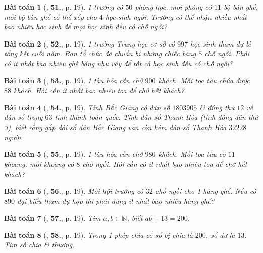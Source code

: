 \documentclass{article}
\numberwithin{equation}{section}
\newtheorem{baitoan}{Bài toán}[section]
\begin{document}
\begin{baitoan}[\cite{Trong_Toan_6_2021}, \textbf{51.}, p. 19]
	1 trường có $50$ phòng học, mỗi phòng có $11$ bộ bàn ghế, mỗi bộ bàn ghế có thể xếp cho $4$ học sinh ngồi. Trường có thể nhận nhiều nhất bao nhiêu học sinh để mọi học sinh đều có chỗ ngồi?
\end{baitoan}

\begin{baitoan}[\cite{Trong_Toan_6_2021}, \textbf{52.}, p. 19]
	1 trường Trung học cơ sở có $997$ học sinh tham dự lễ tổng kết cuối năm. Ban tổ chức đã chuẩn bị những chiếc băng $5$ chỗ ngồi. Phải có ít nhất bao nhiêu ghế băng như vậy để tất cả học sinh đều có chỗ ngồi?
\end{baitoan}

\begin{baitoan}[\cite{Trong_Toan_6_2021}, \textbf{53.}, p. 19]
	1 tàu hỏa cần chở $900$ khách. Mỗi toa tàu chứa được $88$ khách. Hỏi cần ít nhất bao nhiêu toa để chở hết khách?
\end{baitoan}

\begin{baitoan}[\cite{Trong_Toan_6_2021}, \textbf{54.}, p. 19]
	Tỉnh Bắc Giang có dân số $1803905$ \& đứng thứ $12$ về dân số trong $63$ tỉnh thành toàn quốc. Tính dân số Thanh Hóa (tỉnh đông dân thứ 3), biết rằng gấp đôi số dân Bắc Giang vẫn còn kém dân số Thanh Hóa $32228$ người.
\end{baitoan}

\begin{baitoan}[\cite{Trong_Toan_6_2021}, \textbf{55.}, p. 19]
	1 tàu hỏa cần chở $980$ khách. Mỗi toa tàu có $11$ khoang, mỗi khoang có $8$ chỗ ngồi. Hỏi cần có ít nhất bao nhiêu toa để chở hết khách?
\end{baitoan}

\begin{baitoan}[\cite{Trong_Toan_6_2021}, \textbf{56.}, p. 19]
	Mỗi hội trường có $32$ chỗ ngồi cho 1 hàng ghế. Nếu có $890$ đại biểu tham dự họp thì phải dùng ít nhất bao nhiêu hàng ghế?
\end{baitoan}

\begin{baitoan}[\cite{Trong_Toan_6_2021}, \textbf{57.}, p. 19]
	Tìm $a,b\in\mathbb{N}$, biết $ab + 13 = 200$.
\end{baitoan}

\begin{baitoan}[\cite{Trong_Toan_6_2021}, \textbf{58.}, p. 19]
	Trong 1 phép chia có số bị chia là $200$, số dư là $13$. Tìm số chia \& thương.
\end{baitoan}
\end{document}
